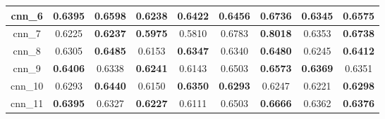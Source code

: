 \begin{table}[h]
\begin{tabular} {|c|c|c|c|c|c|c|c|c| }
    cnn\_6    & 0.6395 & \textbf{0.6598} & 0.6238 & \textbf{0.6422} & 0.6456 & \textbf{0.6736} & 0.6345 & \textbf{0.6575} \\ \hline
    cnn\_7    & 0.6225 & \textbf{0.6237} & \textbf{0.5975} & 0.5810 & 0.6783 & \textbf{\cellcolor{green!50}0.8018} & 0.6353 & \textbf{0.6738} \\ \hline
    cnn\_8    & 0.6305 & \textbf{0.6485} & 0.6153 & \textbf{0.6347} & 0.6340 & \textbf{0.6480} & 0.6245 & \textbf{0.6412} \\ \hline
    cnn\_9    & \textbf{0.6406} & 0.6338 & \textbf{0.6241} & 0.6143 & 0.6503 & \textbf{0.6573} & \textbf{0.6369} & 0.6351 \\ \hline
    cnn\_10   & 0.6293 & \textbf{0.6440} & 0.6150 & \textbf{0.6350} & \textbf{0.6293} & 0.6247 & 0.6221 & \textbf{0.6298} \\ \hline
    cnn\_11   & \textbf{0.6395} & 0.6327 & \textbf{0.6227} & 0.6111 & 0.6503 & \textbf{0.6666} & 0.6362 & \textbf{0.6376} \\ \hline
    \end{tabular}
    \end{table}
    

